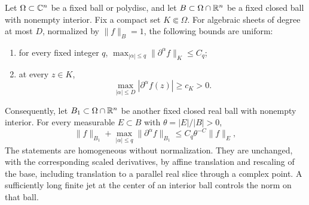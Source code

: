 \begin{lemma}
\label{lem:algebraic-norm}
Let \(\Omega\subset\mathbb C^n\) be a fixed ball or polydisc, and let
\(B\subset\Omega\cap\mathbb R^n\) be a fixed closed ball with nonempty interior.
Fix a compact set \(K\Subset\Omega\).  For algebraic sheets of degree at most
\(D\), normalized by \(\|f\|_B=1\), the following bounds are uniform:
\begin{enumerate}
\item for every fixed integer \(q\),
\(\max_{|\alpha|\le q}\|\partial^\alpha f\|_K\le C_q\);
\item at every \(z\in K\),
\[
 \max_{|\alpha|\le D}|\partial^\alpha f(z)|\ge c_K>0.
\]
\end{enumerate}
Consequently, let \(B_1\subset\Omega\cap\mathbb R^n\) be another fixed
closed real ball with nonempty interior.  For every measurable
\(E\subset B\) with \(\theta=|E|/|B|>0\),
\begin{equation}
 \|f\|_{B_1}
 +\max_{|\alpha|\le q}\|\partial^\alpha f\|_{B_1}
 \le C_q\theta^{-C}\|f\|_E,
 \label{a02:remez}
\end{equation}
The statements are homogeneous without normalization.  They are unchanged,
with the corresponding scaled derivatives, by affine translation and
rescaling of the base, including translation to a parallel real slice
through a complex point.  A sufficiently long finite jet at the center of
an interior ball controls the norm on that ball.
\end{lemma}

